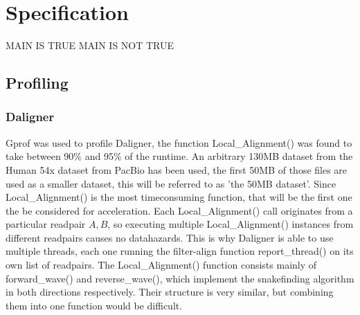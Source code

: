 \documentclass[../main/thesis.tex]{subfiles}
\begin{document}
\chapter{Specification}
\ifdefined\main
\acresetall
MAIN IS TRUE
\newcommand{\codePath}{../4_specification/code/}
\newcommand{\figPath}{../4_specification/figures/}
\else
MAIN IS NOT TRUE

\fi

\section{Profiling}




\subsection{Daligner}
Gprof \cite{gprof} was used to profile Daligner, the function Local\_Alignment() was found to take between 90\% and 95\% of the runtime.
An arbitrary 130MB dataset from the Human 54x dataset from PacBio has been used, the first 50MB of those files are used as a smaller dataset, this will be referred to as 'the 50MB dataset'.
Since Local\_Alignment() is the most timeconsuming function, that will be the first one the be considered for acceleration.
Each Local\_Alignment() call originates from a particular readpair $A, B$, so executing multiple Local\_Alignment() instances from different readpairs causes no datahazards.
This is why Daligner is able to use multiple threads, each one running the filter-align function report\_thread() on its own list of readpairs.
The Local\_Alignment() function consists mainly of forward\_wave() and reverse\_wave(), which implement the snakefinding algorithm in both directions respectively.
Their structure is very similar, but combining them into one function would be difficult.
\end{document}
